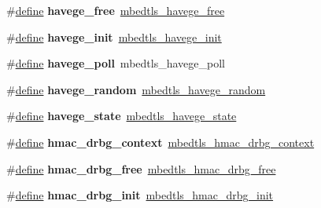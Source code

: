 \begin{DoxyCompactItemize}
\item 
\mbox{\label{compat-1_83_8h_a8818a2f871d0bb85a590b8dbeea51f95}} 
\#\hyperlink{structdefine}{define} {\bfseries havege\+\_\+free}~\hyperlink{havege_8h_a061c764314cfb0c50ad6815596a99b50}{mbedtls\+\_\+havege\+\_\+free}
\item 
\mbox{\label{compat-1_83_8h_ac2039b753596021d3226300c27d36dec}} 
\#\hyperlink{structdefine}{define} {\bfseries havege\+\_\+init}~\hyperlink{havege_8h_a37279eecf09d4665ae18ad98c7c77f72}{mbedtls\+\_\+havege\+\_\+init}
\item 
\mbox{\label{compat-1_83_8h_a7ff7352c39f3fa7fc36647fe80417d09}} 
\#\hyperlink{structdefine}{define} {\bfseries havege\+\_\+poll}~mbedtls\+\_\+havege\+\_\+poll
\item 
\mbox{\label{compat-1_83_8h_a331a6242952b2ab73b8a644b1ad5da72}} 
\#\hyperlink{structdefine}{define} {\bfseries havege\+\_\+random}~\hyperlink{havege_8h_ad18325f837c7482ee7de5bc31e9b57aa}{mbedtls\+\_\+havege\+\_\+random}
\item 
\mbox{\label{compat-1_83_8h_ac24f9e05917ba47fa071d320d92ba1ed}} 
\#\hyperlink{structdefine}{define} {\bfseries havege\+\_\+state}~\hyperlink{structmbedtls__havege__state}{mbedtls\+\_\+havege\+\_\+state}
\item 
\mbox{\label{compat-1_83_8h_a4186f1ec2c7a8bb95ab90e9d9bcbaf39}} 
\#\hyperlink{structdefine}{define} {\bfseries hmac\+\_\+drbg\+\_\+context}~\hyperlink{structmbedtls__hmac__drbg__context}{mbedtls\+\_\+hmac\+\_\+drbg\+\_\+context}
\item 
\mbox{\label{compat-1_83_8h_a89ce7caa4ec2a667eabf7725411cf571}} 
\#\hyperlink{structdefine}{define} {\bfseries hmac\+\_\+drbg\+\_\+free}~\hyperlink{hmac__drbg_8h_a41e1f127304b1228d9f134d38e200e8a}{mbedtls\+\_\+hmac\+\_\+drbg\+\_\+free}
\item 
\mbox{\label{compat-1_83_8h_ad7fd93442e5cc4a5838a34da2035580f}} 
\#\hyperlink{structdefine}{define} {\bfseries hmac\+\_\+drbg\+\_\+init}~\hyperlink{hmac__drbg_8h_a10881c328300a9ddb7cd5fe359c18acd}{mbedtls\+\_\+hmac\+\_\+drbg\+\_\+init}
\item 

\end{DoxyCompactItemize}
